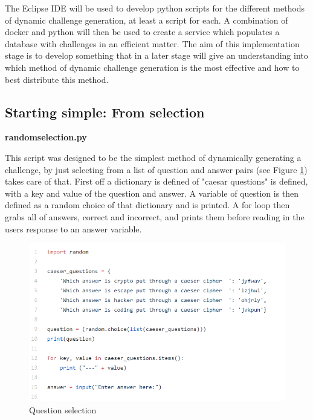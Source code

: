 \documentclass[12pt,a4paper]{article}
\begin{document}
The Eclipse IDE will be used to develop python scripts for the different methods of dynamic challenge generation, at least a script for each. A combination of docker and python will then be used to create a service which populates a database with challenges in an efficient matter. The aim of this implementation stage is to develop something that in a later stage will give an understanding into which method of dynamic challenge generation is the most effective and how to best distribute this method.   


\subsection{Starting simple: From selection}  
\textbf{random\textunderscore selection.py}  

This script was designed to be the simplest method of dynamically generating a challenge, by just selecting from a list of question and answer pairs (see Figure \ref{Random1}) takes care of that. First off a dictionary is defined of "caesar questions" is defined, with a key and value of the question and answer. A variable of question is then defined as a random choice of that dictionary and is printed. A for loop then grabs all of answers, correct and incorrect, and prints them before reading in the users response to an answer variable. 

\begin{figure}[!ht]
    \centering
    \includegraphics[width=1.0\textwidth]{Figs/random1.PNG} 
    \caption{Question selection} 
    \label{Random1}
\end{figure}   
\end{document}
